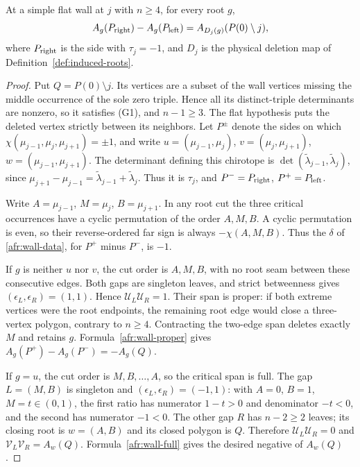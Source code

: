 \begin{theorem}\label{thm:A-S3}\leanok
At a simple flat wall at $j$ with $n\geq4$, for every root $g$,
\begin{equation}\label{afr:S3}
A_g(P_{\rm right})-A_g(P_{\rm left})
=A_{D_j(g)}(P(0)\setminus j),
\end{equation}
where $P_{\rm right}$ is the side with $\tau_j=-1$, and
$D_j$ is the physical deletion map of Definition~\ref{def:induced-roots}.

\end{theorem}
\begin{proof}\leanok{}
Put $Q=P(0)\setminus j$. Its vertices are a subset of the wall
vertices missing the middle occurrence of the sole zero triple. Hence
all its distinct-triple determinants are nonzero, so it satisfies (G1),
and $n-1\geq3$. The flat hypothesis puts the deleted vertex strictly
between its neighbors. Let $P^\pm$ denote the sides on which
$\chi(\mu_{j-1},\mu_j,\mu_{j+1})=\pm1$, and write
$u=(\mu_{j-1},\mu_j)$, $v=(\mu_j,\mu_{j+1})$,
$w=(\mu_{j-1},\mu_{j+1})$. The determinant defining this chirotope
is $\det(\widetilde\lambda_{j-1},\widetilde\lambda_j)$, since
$\mu_{j+1}-\mu_{j-1}=\widetilde\lambda_{j-1}+\widetilde\lambda_j$.
Thus it is $\tau_j$, and $P^-=P_{\rm right}$,
$P^+=P_{\rm left}$.

Write $A=\mu_{j-1}$, $M=\mu_j$, $B=\mu_{j+1}$.  In any root cut the
three critical occurrences have a cyclic permutation of the order
$A,M,B$.  A cyclic permutation is even, so their reverse-ordered far
sign is always $-\chi(A,M,B)$.  Thus the $\delta$ of
\eqref{afr:wall-data}, for $P^+$ minus $P^-$, is $-1$.

If $g$ is neither $u$ nor $v$, the cut order is $A,M,B$, with no
root seam between these consecutive edges.  Both gaps are singleton
leaves, and strict betweenness gives
$(\epsilon_L,\epsilon_R)=(1,1)$.  Hence $\mathcal U_L\mathcal U_R=1$.
Their span is proper: if both extreme vertices were the root endpoints,
the remaining root edge would close a three-vertex polygon, contrary
to $n\geq4$.  Contracting the two-edge span deletes exactly $M$
and retains $g$.  Formula~\eqref{afr:wall-proper} gives
$A_g(P^+)-A_g(P^-)=-A_g(Q)$.

If $g=u$, the cut order is $M,B,\ldots,A$, so the critical span is
full.  The gap $L=(M,B)$ is singleton and
$(\epsilon_L,\epsilon_R)=(-1,1)$: with $A=0$, $B=1$,
$M=t\in(0,1)$, the first ratio has numerator $1-t>0$ and
denominator $-t<0$, and the second has numerator $-1<0$.
The other gap $R$ has $n-2\geq2$ leaves; its closing root is
$w=(A,B)$ and its closed polygon is $Q$.  Therefore
$\mathcal U_L\mathcal U_R=0$ and $\mathcal V_L\mathcal V_R=A_w(Q)$.
Formula~\eqref{afr:wall-full} gives the desired negative of $A_w(Q)$.


\end{proof}
